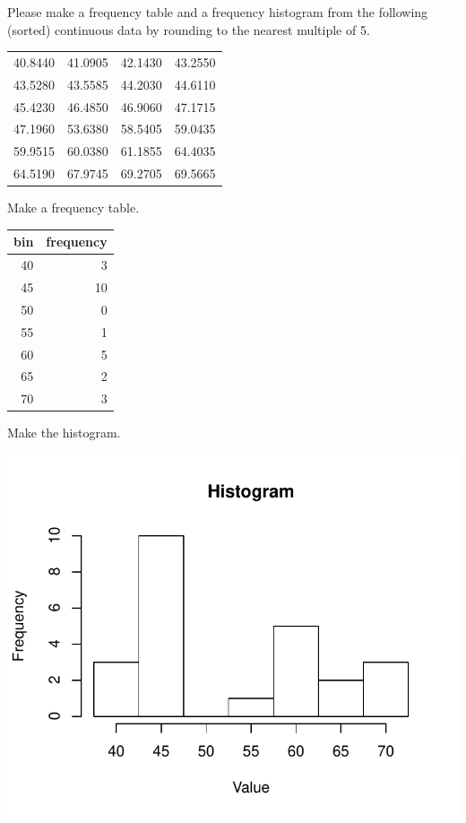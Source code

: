
\begin{question}
Please make a frequency table and a frequency histogram from the
following (sorted) continuous data by rounding to the nearest multiple
of 5.

\begin{longtable}[]{@{}rrrr@{}}
\toprule
\endhead
40.8440 & 41.0905 & 42.1430 & 43.2550\tabularnewline
43.5280 & 43.5585 & 44.2030 & 44.6110\tabularnewline
45.4230 & 46.4850 & 46.9060 & 47.1715\tabularnewline
47.1960 & 53.6380 & 58.5405 & 59.0435\tabularnewline
59.9515 & 60.0380 & 61.1855 & 64.4035\tabularnewline
64.5190 & 67.9745 & 69.2705 & 69.5665\tabularnewline
\bottomrule
\end{longtable}
\end{question}

\begin{solution}
Make a frequency table.

\begin{longtable}[]{@{}rr@{}}
\toprule
bin & frequency\tabularnewline
\midrule
\endhead
40 & 3\tabularnewline
45 & 10\tabularnewline
50 & 0\tabularnewline
55 & 1\tabularnewline
60 & 5\tabularnewline
65 & 2\tabularnewline
70 & 3\tabularnewline
\bottomrule
\end{longtable}

Make the histogram.

\includegraphics{barchart-1-7.pdf}\\
\end{solution}

